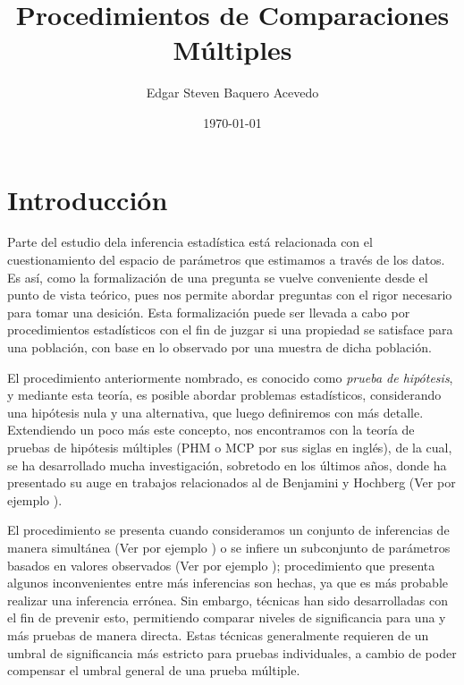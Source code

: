 \documentclass{article}
\title{Procedimientos de Comparaciones Múltiples}
\author{Edgar Steven Baquero Acevedo}
\date{\today}
\theoremstyle{definition}
\begin{document}
\maketitle
\section{Introducción}
Parte del estudio dela inferencia estadística está relacionada con el cuestionamiento del espacio de parámetros que estimamos a través de los datos. Es así, como la formalización de una pregunta se vuelve conveniente desde el punto de vista teórico, pues nos permite abordar preguntas con el rigor necesario para tomar una desición. Esta formalización puede ser llevada a cabo por procedimientos estadísticos con el fin de juzgar si una propiedad se satisface para una población, con base en lo observado por una muestra de dicha población.

El procedimiento anteriormente nombrado, es conocido como \linebreak \textit{prueba de hipótesis}, y mediante esta teoría, es posible abordar problemas estadísticos, considerando una hipótesis nula y una alternativa, que luego definiremos con más detalle. Extendiendo un poco más este concepto, nos encontramos con la teoría de pruebas de hipótesis múltiples (PHM o MCP por sus siglas en inglés), de la cual, se ha desarrollado mucha investigación, sobretodo en los últimos años, donde ha presentado su auge en trabajos relacionados al de Benjamini y Hochberg (Ver por ejemplo \cite{BH}).%

El procedimiento se presenta cuando consideramos un conjunto de inferencias de manera simultánea (Ver por ejemplo \cite{Miller})%
 o se infiere un subconjunto de parámetros basados en valores observados (Ver por ejemplo \cite{Benjamini-2010});%
 procedimiento que presenta algunos inconvenientes entre más inferencias son hechas, ya que es más probable realizar una inferencia errónea. Sin embargo, técnicas han sido desarrolladas con el fin de prevenir esto, permitiendo comparar niveles de significancia para una y más pruebas de manera directa. Estas técnicas generalmente requieren de un umbral de significancia más estricto para pruebas individuales, a cambio de poder compensar el umbral general de una prueba múltiple.
 	
\end{document}
